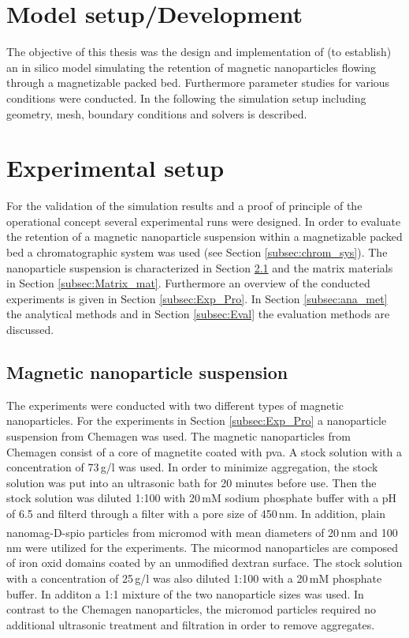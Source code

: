 \section{Model setup/Development}
\label{sec:Model_setup}
The objective of this thesis was the design and implementation of (to establish) an in silico model simulating the retention of magnetic nanoparticles flowing through a magnetizable packed bed. Furthermore parameter studies for various conditions were conducted. In the following the simulation setup including geometry, mesh, boundary conditions and solvers is described.    

\section{Experimental setup}
\label{sec:Exp_setup}
For the validation of the simulation results and a proof of principle of the operational concept several experimental runs were designed. In order to evaluate the retention of a magnetic nanoparticle suspension within a magnetizable packed bed a chromatographic system was used (see Section \ref{subsec:chrom_sys}). The nanoparticle suspension is characterized in Section \ref{subsec:Mag_nanoparticles} and the matrix materials in Section \ref{subsec:Matrix_mat}. Furthermore an overview of the conducted experiments is given in Section \ref{subsec:Exp_Pro}. In Section \ref{subsec:ana_met} the analytical methods and in Section \ref{subsec:Eval} the evaluation methods are discussed.    


\subsection{Magnetic nanoparticle suspension}
\label{subsec:Mag_nanoparticles}
The experiments were conducted with two different types of magnetic nanoparticles. For the experiments in Section \ref{subsec:Exp_Pro} a nanoparticle suspension from Chemagen was used. The magnetic nanoparticles from Chemagen consist of a core of magnetite coated with \gls{pva}. A stock solution with a concentration of 73\,g/l was used. In order to minimize aggregation, the stock solution was put into an ultrasonic bath for 20 minutes before use. Then the stock solution was diluted 1:100 with 20\,mM sodium phosphate buffer with a pH of 6.5 and filterd through a filter with a pore size of 450\,nm. 
In addition,  plain nanomag\textsuperscript{\textregistered}-D-spio particles from micromod with mean diameters of 20\,nm and 100\,nm were utilized for the experiments. The micormod nanoparticles are composed of iron oxid domains coated by an unmodified dextran surface. The stock solution with a concentration of 25\,g/l was also diluted 1:100 with a 20\,mM phosphate buffer. In additon a 1:1 mixture of the two nanoparticle sizes was used. In contrast to the Chemagen nanoparticles, the micromod particles required no additional ultrasonic treatment and filtration in order to remove aggregates.     

